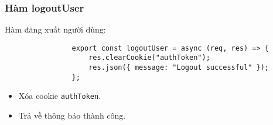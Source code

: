             \subsubsection{Hàm logoutUser}
                \hspace*{0.6cm}Hàm đăng xuất người dùng:
                \begin{lstlisting}
                export const logoutUser = async (req, res) => {
                    res.clearCookie("authToken");
                    res.json({ message: "Logout successful" });
                };
                \end{lstlisting}
                \begin{itemize}
                    \item Xóa cookie \texttt{authToken}.
                    \item Trả về thông báo thành công.
                \end{itemize}

